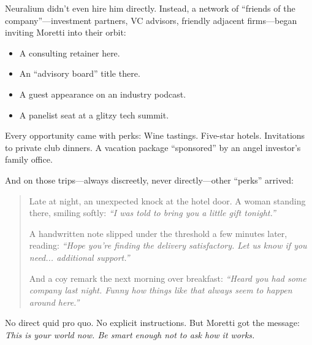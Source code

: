 Neuralium didn’t even hire him directly. Instead, a network of “friends of the company”—investment partners, VC advisors, friendly adjacent firms—began inviting Moretti into their orbit:
\begin{itemize}
  \item A consulting retainer here.
  \item An “advisory board” title there.
  \item A guest appearance on an industry podcast.
  \item A panelist seat at a glitzy tech summit.
\end{itemize}

Every opportunity came with perks:  Wine tastings. Five-star hotels. Invitations to private club dinners. A vacation package “sponsored” by an angel investor’s family office.

And on those trips—always discreetly, never directly—other “perks” arrived:

\begin{quote}
Late at night, an unexpected knock at the hotel door.  
A woman standing there, smiling softly:  \textit{“I was told to bring you a little gift tonight.”}

A handwritten note slipped under the threshold a few minutes later, reading:  
\textit{“Hope you’re finding the delivery satisfactory. Let us know if you need... additional support.”}

And a coy remark the next morning over breakfast:  
\textit{“Heard you had some company last night. Funny how things like that always seem to happen around here.”}
\end{quote}


No direct quid pro quo.  No explicit instructions.  But Moretti got the message:  \textit{This is your world now. Be smart enough not to ask how it works.}

\medskip


